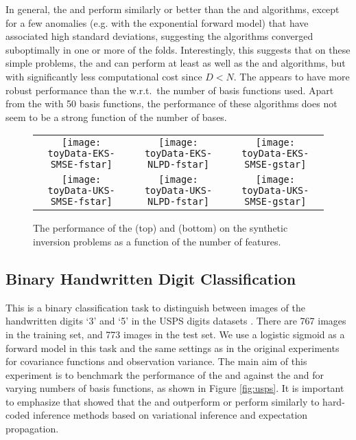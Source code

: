 In general, the \eks and \uks perform similarly or better than the \egp and
\ugp algorithms, except for a few anomalies (e.g. \egp with the exponential
forward model) that have associated high standard deviations, suggesting the
algorithms converged suboptimally in one or more of the folds. Interestingly,
this suggests that on these simple problems, the \eks and \uks can perform at
least as well as the \egp and \ugp algorithms, but with significantly less
computational cost since $D < N$. The \eks appears to have more robust
performance than the \uks w.r.t.\ the number of basis functions used. Apart
from the \uks with 50 basis functions, the performance of these algorithms does
not seem to be a strong function of the number of bases. 

\begin{figure*}
\centering
\begin{tabular}{c c c}
\texttt{[image: toyData-EKS-SMSE-fstar]} &
\texttt{[image: toyData-EKS-NLPD-fstar]} &
\texttt{[image: toyData-EKS-SMSE-gstar]} \\
\texttt{[image: toyData-UKS-SMSE-fstar]} &
\texttt{[image: toyData-UKS-NLPD-fstar]} &
\texttt{[image: toyData-UKS-SMSE-gstar]} \\
\end{tabular}
\caption{The performance of the \eks (top) and \uks (bottom)
on the synthetic inversion problems as a function of the number of features. 
\label{fig:toyinversions}
}
\end{figure*} 
%
\subsection{Binary Handwritten Digit Classification}
This is a binary classification task to
distinguish between images of the handwritten digits `3' and `5' in the USPS
digits datasets \cite{rasmussen-williams-book}. There are 767 images in the
training set, and 773 images in the test set. We use a logistic sigmoid as a
forward model in this task and the same settings as in the original
    experiments for covariance functions and observation variance. The main
aim of this experiment  is to benchmark the performance of the \eks and
\uks against the \egp and \ugp for varying numbers of basis functions, as shown
in Figure \ref{fig:usps}. It is important to emphasize that \citet{steinberg-bonilla-nips-2014} 
showed that the \egp and \ugp outperform or perform similarly to
hard-coded inference methods based on variational inference and expectation propagation.


